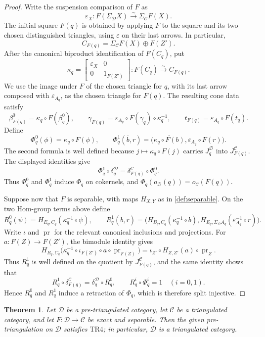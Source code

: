 \documentclass[a4paper,11pt,reqno]{amsart}
\newtheorem{theorem}{Theorem}[section]
\theoremstyle{definition}
\theoremstyle{plain}
\numberwithin{equation}{section}
\newcommand{\C}{\mathcal C}
\newcommand{\D}{\mathcal D}
\begin{document}
\begin{proof}
Write the suspension comparison of \(F\) as
\[
 \varepsilon_X:F(\Sigma_\D X)\xrightarrow{\sim}\Sigma_\C F(X).
\]
The initial square \(F(q)\) is obtained by applying \(F\) to the square
and its two chosen distinguished triangles, using \(\varepsilon\) on their last
arrows.  In particular,
\[
 C_{F(q)}=\Sigma_\C F(X)\oplus F(Z').
\]
After the canonical biproduct identification of \(F(C_q)\), put
\[
 \kappa_q=
 \begin{bmatrix}\varepsilon_X&0\\0&1_{F(Z')}\end{bmatrix}:
 F(C_q)\xrightarrow{\sim}C_{F(q)}.
\]
We use the image under \(F\) of the chosen triangle for \(q\), with its
last arrow composed with \(\varepsilon_{A_q}\), as the chosen triangle
for \(F(q)\).  The resulting cone data satisfy
\[
 \beta^0_{F(q)}=\kappa_q\circ F(\beta_q^0),\qquad
 \gamma_{F(q)}
 =\varepsilon_{A_q}\circ F(\gamma_q)\circ\kappa_q^{-1},\qquad
 t_{F(q)}=\varepsilon_{A_q}\circ F(t_q).
\]
Define
\[
 \Phi_q^0(\phi)=\kappa_q\circ F(\phi),
 \qquad
 \Phi_q^1(\bar b,r)=
 \bigl(\overline{\kappa_q\circ F(b)},
       \varepsilon_{A_q}\circ F(r)\bigr).
\]
The second formula is well defined because
\(j\mapsto\kappa_q\circ F(j)\) carries \(J_q^\D\) into
\(J_{F(q)}^\C\).  The
displayed identities give
\[
 \Phi_q^1\circ\delta_q^\D
 =\delta_{F(q)}^\C\circ\Phi_q^0.
\]
Thus \(\Phi_q^0\) and \(\Phi_q^1\) induce \(\Phi_q\) on cokernels, and
\(\Phi_q(o_\D(q))=o_\C(F(q))\).

Suppose now that \(F\) is separable, with maps \(H_{X,Y}\) as in
\cref{def:separable}.  On the two Hom-group terms above define
\[
 R_q^0(\psi)=H_{E_q,C_q}(\kappa_q^{-1}\circ\psi),
 \qquad
 R_q^1(\bar b,r)=
 \bigl(\overline{H_{B_q,C_q}(\kappa_q^{-1}\circ b)},
 H_{E_q,\Sigma_\D A_q}(\varepsilon_{A_q}^{-1}\circ r)\bigr).
\]
Write \(\iota\) and \(\operatorname{pr}\) for the relevant canonical
inclusions and projections.  For \(a:F(Z)\to F(Z')\), the bimodule identity gives
\[
 H_{B_q,C_q}\bigl(\kappa_q^{-1}\circ\iota_{F(Z')}\circ a
 \circ\operatorname{pr}_{F(Z)}\bigr)
 =\iota_{Z'}\circ H_{Z,Z'}(a)\circ\operatorname{pr}_Z.
\]
Thus \(R_q^1\) is well defined on the quotient by \(J_{F(q)}^\C\), and the same
identity shows that
\[
 R_q^1\circ\delta_{F(q)}^\C=\delta_q^\D\circ R_q^0,
 \qquad
 R_q^i\circ\Phi_q^i=1\quad(i=0,1).
\]
Hence \(R_q^0\) and \(R_q^1\) induce a retraction of \(\Phi_q\), which is
therefore split injective.
\end{proof}

\begin{theorem}
\label{thm:separable-descent}
Let \(\D\) be a pre-triangulated category, let \(\C\) be a triangulated
category, and let
$F:\D\to\C$ be exact and separable.  Then the given pre-triangulation on
$\D$ satisfies $\mathrm{TR4}$; in particular, $\D$ is a triangulated
category.
\end{theorem}
\end{document}
